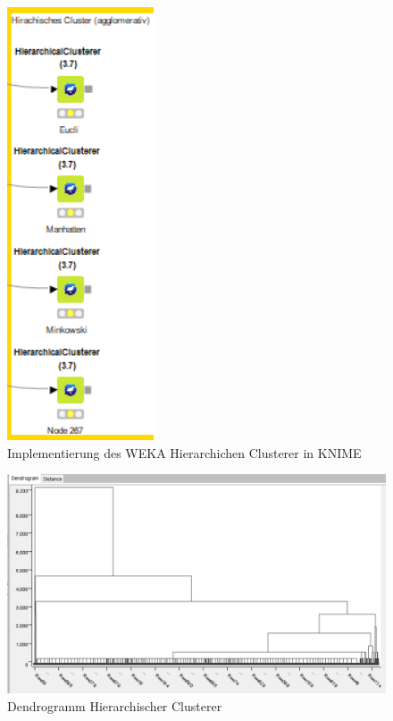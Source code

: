 \documentclass[
	handout,
  	aspectratio=169
]{beamer}
\begin{document}
	\begin{frame}
	\begin{center}					
					\begin{figure}[h]
						\includegraphics[scale=0.5]{../pictures/hierach.png}
						\caption{Implementierung des WEKA Hierarchichen Clusterer in KNIME}		
					\end{figure}	
				\end{center}	
	\end{frame}
		\begin{frame}
	\begin{center}					
					\begin{figure}[h]
						\includegraphics[scale=0.7]{../pictures/dendro.png}
						\caption{Dendrogramm Hierarchischer Clusterer}		
					\end{figure}	
				\end{center}	
	\end{frame}
			
\end{document}
